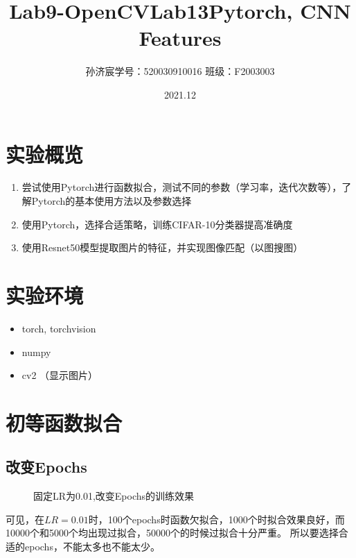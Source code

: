 \documentclass[12pt,a4paper]{article}
\title{Lab9-OpenCV}
\title{Lab13\quad Pytorch, CNN Features}
\date{2021.12}
\author{孙济宸\quad \quad 学号：520030910016 \quad  \quad 班级：F2003003}
\begin{document}
\maketitle
\section{实验概览}
\begin{enumerate}
\item 尝试使用Pytorch进行函数拟合，测试不同的参数（学习率，迭代次数等），了解Pytorch的基本使用方法以及参数选择
\item 使用Pytorch，选择合适策略，训练CIFAR-10分类器提高准确度
\item 使用Resnet50模型提取图片的特征，并实现图像匹配（以图搜图）
\end{enumerate}
\section{实验环境}
\begin{itemize}
	\item torch, torchvision
	\item numpy
	\item cv2 （显示图片）

\end{itemize}
\newpage



\section{初等函数拟合}
\subsection{改变Epochs}
\begin{figure}[H]
	\caption{固定LR为0.01,改变Epochs的训练效果}
	\centering
\end{figure}
可见，在$LR=0.01$时，100个epochs时函数欠拟合，1000个时拟合效果良好，而10000个和5000个均出现过拟合，50000个的时候过拟合十分严重。 所以要选择合适的epochs，不能太多也不能太少。
\end{document}
